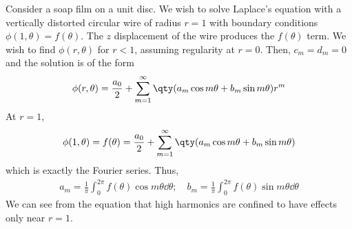 \begin{example}
	Consider a soap film on a unit disc.
	We wish to solve Laplace's equation with a vertically distorted circular wire of radius $r = 1$ with boundary conditions $\phi(1, \theta) = f(\theta)$.
	The $z$ displacement of the wire produces the $f(\theta)$ term.
	We wish to find $\phi(r,\theta)$ for $r < 1$, assuming regularity at $r = 0$.
	Then, $c_m = d_m = 0$ and the solution is of the form
	\begin{align*}
		\phi(r,\theta) = \frac{a_0}{2} + \sum_{m=1}^\infty \qty(a_m \cos m\theta + b_m \sin m\theta) r^m
	\end{align*}
	At $r = 1$,
	\begin{align*}
		\phi(1,\theta) = f(\theta) = \frac{a_0}{2} + \sum_{m=1}^\infty \qty(a_m \cos m\theta + b_m \sin m\theta)
	\end{align*}
	which is exactly the Fourier series.
	Thus,
	\begin{align*}
		a_m = \frac{1}{\pi} \int_0^{2\pi} f(\theta) \cos m \theta \dd{\theta};\quad b_m = \frac{1}{\pi} \int_0^{2\pi} f(\theta) \sin m \theta \dd{\theta}
	\end{align*}
	We can see from the equation that high harmonics are confined to have effects only near $r = 1$.
\end{example}

